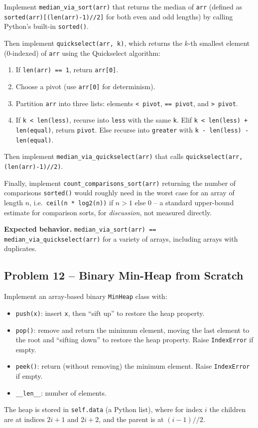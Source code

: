 \documentclass[11pt]{article}
\begin{document}
Implement \texttt{median\_via\_sort(arr)} that returns the median of \texttt{arr} (defined
as \texttt{sorted(arr)[(len(arr)-1)//2]} for both even and odd lengths) by calling
Python's built-in \texttt{sorted()}.

Then implement \texttt{quickselect(arr, k)}, which returns the $k$-th smallest element
(0-indexed) of \texttt{arr} using the Quickselect algorithm:
\begin{enumerate}
    \item If \texttt{len(arr) == 1}, return \texttt{arr[0]}.
    \item Choose a pivot (use \texttt{arr[0]} for determinism).
    \item Partition \texttt{arr} into three lists: elements \texttt{< pivot}, \texttt{==
    pivot}, and \texttt{> pivot}.
    \item If \texttt{k < len(less)}, recurse into \texttt{less} with the same \texttt{k}.
    Elif \texttt{k < len(less) + len(equal)}, return \texttt{pivot}. Else recurse into
    \texttt{greater} with \texttt{k - len(less) - len(equal)}.
\end{enumerate}

Then implement \texttt{median\_via\_quickselect(arr)} that calls
\texttt{quickselect(arr, (len(arr)-1)//2)}.

Finally, implement \texttt{count\_comparisons\_sort(arr)} returning the number of
comparisons \texttt{sorted()} would roughly need in the worst case for an array of length
$n$, i.e.\ \texttt{ceil(n * log2(n))} if $n>1$ else $0$ -- a standard upper-bound estimate
for comparison sorts, for \emph{discussion}, not measured directly.

\textbf{Expected behavior.} \texttt{median\_via\_sort(arr) ==
median\_via\_quickselect(arr)} for a variety of arrays, including arrays with duplicates.

\subsection*{Problem 12 -- Binary Min-Heap from Scratch}

Implement an array-based binary \texttt{MinHeap} class with:
\begin{itemize}
    \item \texttt{push(x)}: insert \texttt{x}, then ``sift up'' to restore the heap
    property.
    \item \texttt{pop()}: remove and return the minimum element, moving the last element
    to the root and ``sifting down'' to restore the heap property. Raise
    \texttt{IndexError} if empty.
    \item \texttt{peek()}: return (without removing) the minimum element. Raise
    \texttt{IndexError} if empty.
    \item \texttt{\_\_len\_\_}: number of elements.
\end{itemize}
The heap is stored in \texttt{self.data} (a Python list), where for index $i$ the children
are at indices $2i+1$ and $2i+2$, and the parent is at $(i-1)//2$.
\end{document}
